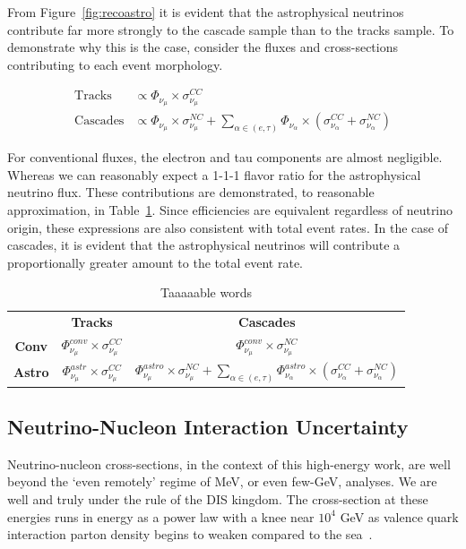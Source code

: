 \documentclass[main.tex]{subfiles}
\begin{document}
From Figure~\ref{fig:recoastro} it is evident that the astrophysical neutrinos contribute far more strongly to the cascade sample than to the tracks sample.
To demonstrate why this is the case, consider the fluxes and cross-sections contributing to each event morphology.

\begin{align}
    \text{Tracks} &\propto \Phi_{\nu_{\mu}}\times \sigma_{\nu_{\mu}}^{CC} \\
    \text{Cascades} &\propto \Phi_{\nu_{\mu}}\times \sigma_{\nu_{\mu}}^{NC}  + \sum_{\alpha\in (e,\tau)}\Phi_{\nu_{\alpha}}\times\left( \sigma_{\nu_{\alpha}}^{CC} +  \sigma_{\nu_{\alpha}}^{NC}\right)
\end{align}

For conventional fluxes, the electron and tau components are almost negligible. 
Whereas we can reasonably expect a 1-1-1 flavor ratio for the astrophysical neutrino flux. 
These contributions are demonstrated, to reasonable approximation, in Table~\ref{tab:astro_stuff}.
Since efficiencies are equivalent regardless of neutrino origin, these expressions are also consistent with total event rates. 
In the case of cascades, it is evident that the astrophysical neutrinos will contribute a proportionally greater amount to the total event rate. 


\begin{table}
    \centering
    \renewcommand{\arraystretch}{1.2}
    \begin{tabular}{c|c|c}\rowcolor{blue!25}
        & \textbf{Tracks} & \textbf{Cascades} \\
    \textbf{Conv} & $ \Phi_{\nu_{\mu}}^{conv}\times \sigma_{\nu_{\mu}}^{CC}$ & $\Phi_{\nu_{\mu}}^{conv}\times \sigma_{\nu_{\mu}}^{NC}$ \\[10pt]
    \textbf{Astro}    & $\Phi_{\nu_{\mu}}^{astr}\times \sigma_{\nu_{\mu}}^{CC}$ & $\Phi_{\nu_{\mu}}^{astro}\times \sigma_{\nu_{\mu}}^{NC}  + \sum\limits_{\alpha\in (e,\tau)}\Phi_{\nu_{\alpha}}^{astro}\times\left( \sigma_{\nu_{\alpha}}^{CC} +  \sigma_{\nu_{\alpha}}^{NC}\right)$
    \end{tabular}
    \caption{Taaaaable words}\label{tab:astro_stuff}
\end{table}



\subsection{Neutrino-Nucleon Interaction Uncertainty}
Neutrino-nucleon cross-sections, in the context of this high-energy work, are well beyond the `even remotely' regime of MeV, or even few-GeV, analyses.
We are well and truly under the rule of the DIS kingdom. 
The cross-section at these energies runs in energy as a power law with a knee near $10^{4}$ GeV as valence quark interaction parton density begins to weaken compared to the sea~\cite{GANDHI199681}.
\end{document}
